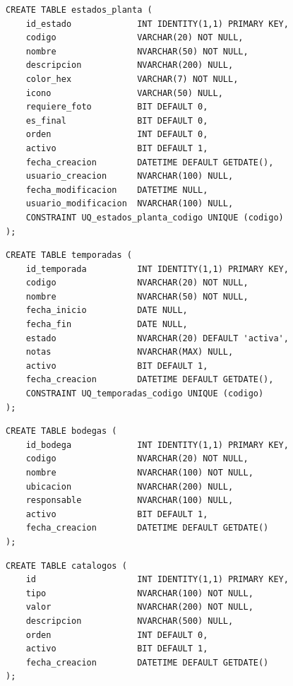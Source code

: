 \documentclass[12pt,a4paper,twoside]{report}
\begin{document}
\begin{lstlisting}[style=sqlstyle, caption={estados\_planta}]
CREATE TABLE estados_planta (
    id_estado             INT IDENTITY(1,1) PRIMARY KEY,
    codigo                VARCHAR(20) NOT NULL,
    nombre                NVARCHAR(50) NOT NULL,
    descripcion           NVARCHAR(200) NULL,
    color_hex             VARCHAR(7) NOT NULL,
    icono                 VARCHAR(50) NULL,
    requiere_foto         BIT DEFAULT 0,
    es_final              BIT DEFAULT 0,
    orden                 INT DEFAULT 0,
    activo                BIT DEFAULT 1,
    fecha_creacion        DATETIME DEFAULT GETDATE(),
    usuario_creacion      NVARCHAR(100) NULL,
    fecha_modificacion    DATETIME NULL,
    usuario_modificacion  NVARCHAR(100) NULL,
    CONSTRAINT UQ_estados_planta_codigo UNIQUE (codigo)
);
\end{lstlisting}

\begin{lstlisting}[style=sqlstyle, caption={temporadas}]
CREATE TABLE temporadas (
    id_temporada          INT IDENTITY(1,1) PRIMARY KEY,
    codigo                NVARCHAR(20) NOT NULL,
    nombre                NVARCHAR(50) NOT NULL,
    fecha_inicio          DATE NULL,
    fecha_fin             DATE NULL,
    estado                NVARCHAR(20) DEFAULT 'activa',
    notas                 NVARCHAR(MAX) NULL,
    activo                BIT DEFAULT 1,
    fecha_creacion        DATETIME DEFAULT GETDATE(),
    CONSTRAINT UQ_temporadas_codigo UNIQUE (codigo)
);
\end{lstlisting}

\begin{lstlisting}[style=sqlstyle, caption={bodegas}]
CREATE TABLE bodegas (
    id_bodega             INT IDENTITY(1,1) PRIMARY KEY,
    codigo                NVARCHAR(20) NOT NULL,
    nombre                NVARCHAR(100) NOT NULL,
    ubicacion             NVARCHAR(200) NULL,
    responsable           NVARCHAR(100) NULL,
    activo                BIT DEFAULT 1,
    fecha_creacion        DATETIME DEFAULT GETDATE()
);
\end{lstlisting}

\begin{lstlisting}[style=sqlstyle, caption={catalogos}]
CREATE TABLE catalogos (
    id                    INT IDENTITY(1,1) PRIMARY KEY,
    tipo                  NVARCHAR(100) NOT NULL,
    valor                 NVARCHAR(200) NOT NULL,
    descripcion           NVARCHAR(500) NULL,
    orden                 INT DEFAULT 0,
    activo                BIT DEFAULT 1,
    fecha_creacion        DATETIME DEFAULT GETDATE()
);
\end{lstlisting}
\end{document}
